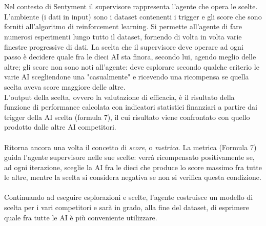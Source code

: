 \documentclass[a4paper,12pt]{report}
\begin{document}
\begin{fig}
\\~\\Nel contesto di Sentyment il supervisore rappresenta l'agente che opera le scelte. L'ambiente (i dati in input) sono i dataset contenenti i trigger e gli score che sono forniti all'algoritmo di reinforcement learning. Si permette all'agente di fare numerosi esperimenti lungo tutto il dataset, fornendo di volta in volta varie finestre progressive di dati. La scelta che il supervisore deve operare ad ogni passo è decidere quale fra le dieci AI sta finora, secondo lui, agendo meglio delle altre; gli score non sono noti all'agente: deve esplorare secondo qualche criterio le varie AI scegliendone una "casualmente" e ricevendo una ricompensa se quella scelta aveva score maggiore delle altre.\\
L'output della scelta, ovvero la valutazione di efficacia, è il risultato della funzione di performance calcolata con indicatori statistici finanziari a partire dai trigger della AI scelta (formula 7), il cui risultato viene confrontato con quello prodotto dalle altre AI competitori.\\~\\Ritorna ancora una volta il concetto di \textit{score}, o \textit{metrica}. La metrica (Formula 7) guida l'agente supervisore nelle sue scelte: verrà ricompensato positivamente se, ad ogni iterazione, sceglie la AI fra le dieci che produce lo score massimo fra tutte le altre, mentre la scelta si considera negativa se non si verifica questa condizione.\\~\\
Continuando ad eseguire esplorazioni e scelte, l'agente costruisce un modello di scelta per i vari competitori e sarà in grado, alla fine del dataset, di esprimere quale fra tutte le AI è più conveniente utilizzare.


\end{fig}
\end{document}

